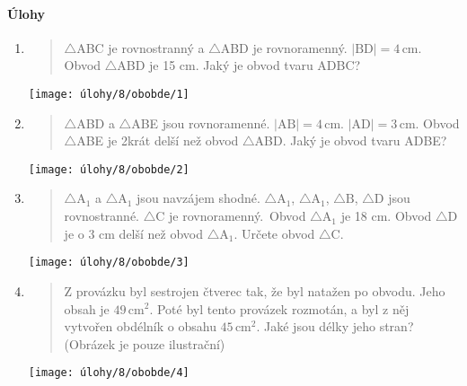 \paragraph{Úlohy}
\begin{enumerate}
    \item
    \begin{minipage}[t]{\linewidth}
        \begin{quote}
            $\triangle$ABC je rovnostranný a $\triangle$ABD je rovnoramenný. $\lvert \text{BD} \rvert = 4\,\text{cm}$.
            Obvod $\triangle$ABD je 15 cm.
            Jaký je obvod tvaru ADBC?
        \end{quote}
        \centering
        \texttt{[image: úlohy/8/obobde/1]}

    \end{minipage}

    \item
    \begin{minipage}[t]{\linewidth}
        \begin{quote}
            $\triangle$ABD a $\triangle$ABE jsou rovnoramenné. $\lvert \text{AB} \rvert = 4\,\text{cm}$. $\lvert \text{AD} \rvert = 3\,\text{cm}$.
            Obvod $\triangle$ABE je 2krát delší než obvod $\triangle$ABD. Jaký je obvod tvaru ADBE?
        \end{quote}
        \centering
        \texttt{[image: úlohy/8/obobde/2]}

    \end{minipage}

    \item
    \begin{minipage}[t]{\linewidth}
        \begin{quote}
            $\triangle{\text{A}}_{1}$ a $\triangle{\text{A}}_{1}$ jsou navzájem shodné. $\triangle{\text{A}}_{1}$, $\triangle{\text{A}}_{1}$, $\triangle{\text{B}}$, $\triangle{\text{D}}$ jsou rovnostranné. $\triangle{\text{C}}$ je rovnoramenný.\             Obvod $\triangle{\text{A}}_{1}$ je 18 cm.
            Obvod $\triangle$D je o 3 cm delší než obvod $\triangle{\text{A}}_{1}$.
            Určete obvod $\triangle$C.
        \end{quote}
        \centering
        \texttt{[image: úlohy/8/obobde/3]}

    \end{minipage}

    \item
    \begin{minipage}[t]{\linewidth}
        \begin{quote}
            Z provázku byl sestrojen čtverec tak, že byl natažen po obvodu.
            Jeho obsah je $49\,\text{cm}^{2}$.
            Poté byl tento provázek rozmotán, a byl z něj vytvořen obdélník o obsahu $45\,\text{cm}^{2}$.
            Jaké jsou délky jeho stran?
            (Obrázek je pouze ilustrační)
        \end{quote}
        \centering
        \texttt{[image: úlohy/8/obobde/4]}


\end{minipage}
\end{enumerate}
